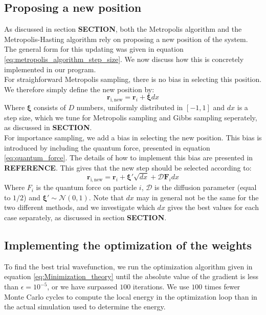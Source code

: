 \documentclass[a4paper, 10pt]{article}
\begin{document}
	\subsection{Proposing a new position}
	As discussed in section \textbf{SECTION}, both the Metropolis algorithm and the Metropolis-Hasting algorithm rely on proposing a new position of the system. The general form for this updating was given in equation \ref{eq:metropolis_algorithm_step_size}. We now discuss how this is concretely implemented in our program.\\
	\linebreak
	For straighforward Metropolis sampling, there is no bias in selecting this position. We therefore simply define the new position by:
	\begin{equation}
	\boldsymbol{r}_{\mathrm{i,new}}=\boldsymbol{r}_i+\boldsymbol{\xi}dx
	\end{equation}
	Where $\boldsymbol{\xi}$ consists of $D$ numbers, uniformly distributed in $[-1,1]$ and $dx$ is a step size, which we tune for Metropolis sampling and Gibbs sampling seperately, as discussed in \textbf{SECTION}.\\
	\linebreak
	For importance sampling, we add a bias in selecting the new position. This bias is introduced by including the quantum force, presented in equation \ref{eq:quantum_force}. The details of how to implement this bias are presented in \textbf{REFERENCE}. This gives that the new step should be selected according to:
	\begin{equation}
	\boldsymbol{r}_{\mathrm{i,new}}=\boldsymbol{r}_i+\boldsymbol{\xi'}\sqrt{dx}+\mathcal{D}\boldsymbol{F}_i dx
	\end{equation}
	Where $F_i$ is the quantum force on particle $i$, $\mathcal{D}$ is the diffusion parameter (equal to $1/2$) and $\boldsymbol{\xi'}\sim \mathcal{N}(0,1)$. Note that $dx$ may in general not be the same for the two different methods, and we investigate which $dx$ gives the best values for each case separately, as discussed in section \textbf{SECTION}.
	\subsection{Implementing the optimization of the weights}
	To find the best trial wavefunction, we run the optimization algorithm given in equation \ref{eq:Minimization_theory} until the absolute value of the gradient is less than $\epsilon=10^{-5}$, or we have surpassed $100$ iterations. We use $100$ times fewer Monte Carlo cycles to compute the local energy in the optimization loop than in the actual simulation used to determine the energy.
\end{document}
